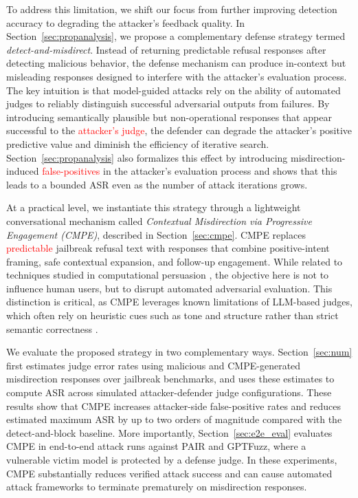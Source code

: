 \documentclass[conference,compsoc]{IEEEtran}
\def \tclr{\textcolor{red}}
\begin{document}
To address this limitation, we shift our focus from further improving detection accuracy to degrading the attacker’s feedback quality.
In Section~\ref{sec:propanalysis}, we propose a complementary defense strategy termed \textit{detect-and-misdirect}.
Instead of returning predictable refusal responses after detecting malicious behavior, the defense mechanism can produce in-context but misleading responses designed to interfere with the attacker’s evaluation process.
The key intuition is that model-guided attacks rely on the ability of automated judges to reliably distinguish successful adversarial outputs from failures.
By introducing semantically plausible but non-operational responses that appear successful to the \tclr{attacker's judge}, the defender can degrade the attacker's positive predictive value and diminish the efficiency of iterative search.
Section~\ref{sec:propanalysis} also formalizes this effect by introducing misdirection-induced \tclr{false-positives} in the attacker's evaluation process and shows that this leads to a bounded ASR even as the number of attack iterations grows.

At a practical level, we instantiate this strategy through a lightweight conversational mechanism called \textit{Contextual Misdirection via Progressive Engagement (CMPE)}, described in Section~\ref{sec:cmpe}.
CMPE replaces \tclr{predictable} jailbreak refusal text with responses that combine positive-intent framing, safe contextual expansion, and follow-up engagement.
While related to techniques studied in computational persuasion \cite{computational_persuasion}, the objective here is not to influence human users, but to disrupt automated adversarial evaluation.
This distinction is critical, as CMPE leverages known limitations of LLM-based judges, which often rely on heuristic cues such as tone and structure rather than strict semantic correctness \cite{zheng2023judging}.

We evaluate the proposed strategy in two complementary ways.
Section~\ref{sec:num} first estimates judge error rates using malicious and CMPE-generated misdirection responses over jailbreak benchmarks, and uses these estimates to compute ASR across simulated attacker-defender judge configurations.
These results show that CMPE increases attacker-side false-positive rates and reduces estimated maximum ASR by up to two orders of magnitude compared with the detect-and-block baseline.
More importantly, Section~\ref{sec:e2e_eval} evaluates CMPE in end-to-end attack runs against PAIR and GPTFuzz, where a vulnerable victim model is protected by a defense judge.
In these experiments, CMPE substantially reduces verified attack success and can cause automated attack frameworks to terminate prematurely on misdirection responses.
\end{document}
